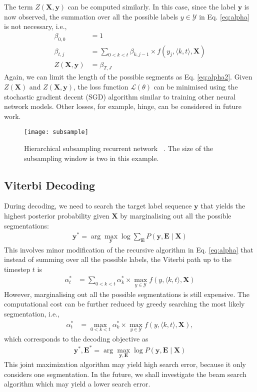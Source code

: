 \documentclass[a4paper]{article}
\begin{document}
The term $Z(\mathbf{X}, \mathbf{y})$ can be computed similarly. In this case, since the label $\mathbf{y}$ is now observed, the summation over all the possible labels $y \in \mathcal{Y}$ in Eq. \eqref{eq:alpha} is not necessary, i.e.,
\begin{align}
\beta_{0,0} &= 1 \\
\label{eq:beta}
\beta_{t,j} & = \sum_{0<k<t} \beta_{k,j-1} \times  f(y_j, \langle k, t \rangle, \mathbf{X}) \\
Z(\mathbf{X}, \mathbf{y}) & = \beta_{T,J}
\end{align}
Again, we can limit the length of the possible segments as Eq. \eqref{eq:alpha2}. Given $Z(\mathbf{X})$ and $Z(\mathbf{X}, \mathbf{y})$, the loss function $\mathcal{L}(\theta)$ can be minimised using the stochastic gradient decent (SGD) algorithm similar to training other neural network models. Other losses, for example, hinge, can be considered in future work.

\begin{figure}[t]
\small
\centerline{\texttt{[image: subsample]}} \vskip -4mm
\caption{ Hierarchical subsampling recurrent network~\cite{graves2012hierarchical} . The size of the subsampling window is two in this example.  }  
\label{fig:hsrnn}
\vskip -5mm
\end{figure}

\subsection{Viterbi Decoding}

During decoding, we need to search the target label sequence $\mathbf{y}$ that yields the highest posterior probability given $\mathbf{X}$ by marginalising out all the possible segmentations:
\begin{align}  
\mathbf{y}^* = \arg\max_{\mathbf{y}} \log \sum_{\mathbf{E}} P(\mathbf{y}, \mathbf{E} \mid \mathbf{X})
\end{align}
This involves minor modification of the recursive algorithm in Eq. \eqref{eq:alpha} that instead of summing over all the possible labels, the Viterbi path up to the timestep $t$ is
\begin{align}
\alpha_{t}^* & = \sum_{0<k<t} \alpha_{k}^* \times \max_{y\in \mathcal{Y}} f(y, \langle k, t \rangle, \mathbf{X}) 
\end{align}
However, marginalising out all the possible segmentations is still expensive. The computational cost can be further reduced by greedy searching the most likely segmentation,  i.e.,
\begin{align}
\alpha_{t}^* & = \max_{0<k<t} \alpha_{k}^* \times \max_{y\in \mathcal{Y}} f(y, \langle k, t \rangle, \mathbf{X}),
\end{align}
which corresponds to the decoding objective as
\begin{align}  
\mathbf{y}^*, \mathbf{E}^*= \arg\max_{\mathbf{y, E}} \log P(\mathbf{y}, \mathbf{E} \mid \mathbf{X})
\end{align}
This joint maximization algorithm may yield high search error, because it only considers one segmentation.  In the future, we shall investigate the beam search algorithm which may yield a lower search error.
\end{document}
